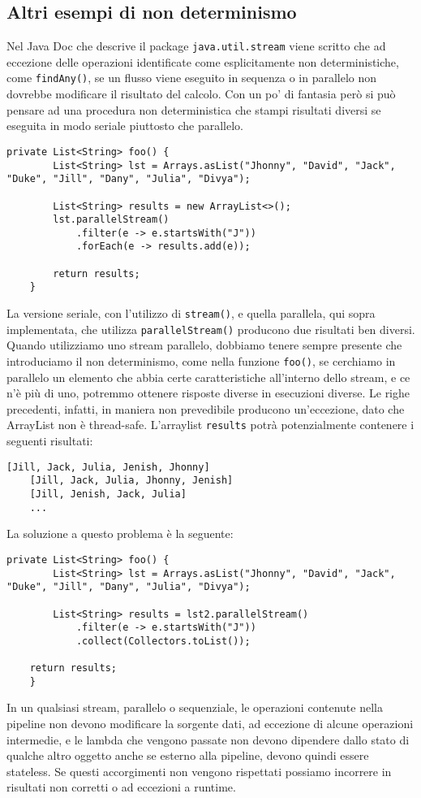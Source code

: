		\subsection{Altri esempi di non determinismo}
			Nel Java Doc che descrive il package \lstinline|java.util.stream| viene scritto che ad eccezione delle operazioni identificate come esplicitamente non deterministiche, come \lstinline|findAny()|, se un flusso viene eseguito in sequenza o in parallelo non dovrebbe modificare il risultato del calcolo. Con un po' di fantasia però si può pensare ad una procedura non deterministica che stampi risultati diversi se eseguita in modo seriale piuttosto che parallelo.
			\begin{lstlisting}[breaklines=true]
	private List<String> foo() {
		List<String> lst = Arrays.asList("Jhonny", "David", "Jack", "Duke", "Jill", "Dany", "Julia", "Divya");
	
		List<String> results = new ArrayList<>();
		lst.parallelStream()
			.filter(e -> e.startsWith("J"))
			.forEach(e -> results.add(e));
			
		return results;
	}
			\end{lstlisting}
			La versione seriale, con l'utilizzo di \lstinline|stream()|, e quella parallela, qui sopra implementata, che utilizza \lstinline|parallelStream()| producono due risultati ben diversi. Quando utilizziamo uno stream parallelo, dobbiamo tenere sempre presente che introduciamo il non determinismo, come nella funzione \lstinline|foo()|, se cerchiamo in parallelo un elemento che abbia certe caratteristiche all'interno dello stream, e ce n'è più di uno, potremmo ottenere risposte diverse in esecuzioni diverse. Le righe precedenti, infatti, in maniera non prevedibile producono un'eccezione, dato che ArrayList non è thread-safe. L'arraylist \lstinline|results| potrà potenzialmente contenere i seguenti risultati:
			\begin{lstlisting}[numbers=none,frame=none]
	[Jill, Jack, Julia, Jenish, Jhonny]
	[Jill, Jack, Julia, Jhonny, Jenish]
	[Jill, Jenish, Jack, Julia]
	...
			\end{lstlisting}
			La soluzione a questo problema è la seguente:
			\begin{lstlisting}[breaklines=true]
	private List<String> foo() {
		List<String> lst = Arrays.asList("Jhonny", "David", "Jack", "Duke", "Jill", "Dany", "Julia", "Divya");
	
		List<String> results = lst2.parallelStream()
			.filter(e -> e.startsWith("J"))
			.collect(Collectors.toList());
	
	return results;
	}
			\end{lstlisting}
			
			In un qualsiasi stream, parallelo o sequenziale, le operazioni contenute nella pipeline non devono modificare la sorgente dati, ad eccezione di alcune operazioni intermedie, e le lambda che vengono passate non devono dipendere dallo stato di qualche altro oggetto anche se esterno alla pipeline, devono quindi essere stateless. Se questi accorgimenti non vengono rispettati possiamo incorrere in risultati non corretti o ad eccezioni a runtime.